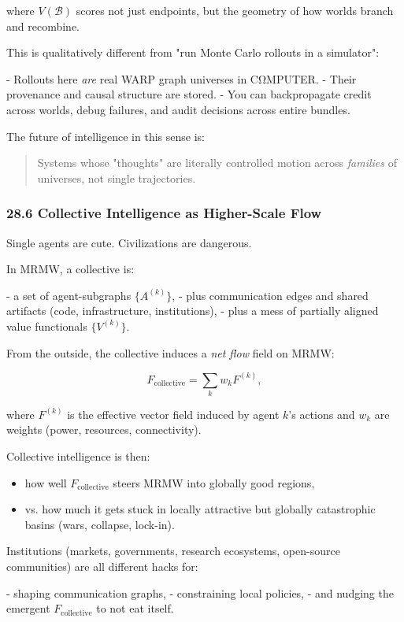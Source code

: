 where $V(\mathcal{B})$ scores not just endpoints, but the geometry of how worlds branch and recombine.

This is qualitatively different from "run Monte Carlo rollouts in a simulator":

- Rollouts here \emph{are} real WARP graph universes in CΩMPUTER.
- Their provenance and causal structure are stored.
- You can backpropagate credit across worlds, debug failures, and audit decisions across entire bundles.

The future of intelligence in this sense is:

\begin{quote}
Systems whose "thoughts" are literally controlled motion across \emph{families} of universes, not single trajectories.
\end{quote}

\subsubsection*{28.6  Collective Intelligence as Higher-Scale Flow}

Single agents are cute. Civilizations are dangerous.

In MRMW, a collective is:

- a set of agent-subgraphs $\{A^{(k)}\}$,
- plus communication edges and shared artifacts (code, infrastructure, institutions),
- plus a mess of partially aligned value functionals $\{V^{(k)}\}$.

From the outside, the collective induces a \emph{net flow} field on MRMW:

\[
  F_\text{collective} = \sum_k w_k F^{(k)},
\]

where $F^{(k)}$ is the effective vector field induced by agent $k$’s actions and
$w_k$ are weights (power, resources, connectivity).

Collective intelligence is then:

\begin{itemize}
  \item how well $F_\text{collective}$ steers MRMW into globally good regions,
  \item vs. how much it gets stuck in locally attractive but globally catastrophic basins (wars, collapse, lock-in).
\end{itemize}

Institutions (markets, governments, research ecosystems, open-source communities)
are all different hacks for:

- shaping communication graphs,
- constraining local policies,
- and nudging the emergent $F_\text{collective}$ to not eat itself.

